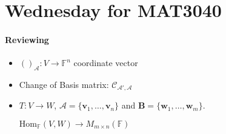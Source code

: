 
\section{Wednesday for MAT3040}
\paragraph{Reviewing}
\begin{itemize}
\item
$()_{\mathcal{A}}:V\to\mathbb{F}^n$ coordinate vector
\item
Change of Basis matrix: $\mathcal{C}_{\mathcal{A}',\mathcal{A}}$
\item
$T:V\to W$, $\mathcal{A}=\{\bm v_1,\dots,\bm v_n\}$ and $\bm B=\{\bm w_1,\dots,\bm w_m\}$.

$\text{Hom}_{\mathbb{F}}(V,W)\to M_{m\times n}(\mathbb{F})$
\end{itemize}

